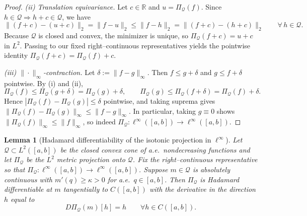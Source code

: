 \documentclass[12pt]{article}
\newtheorem{lemma}{Lemma}
\begin{document}
\begin{proof}
\smallskip
\noindent\emph{(ii) Translation equivariance.}
Let $c\in\mathbb R$ and $u=\Pi_{\mathcal Q}(f)$.
Since $h\in\mathcal Q\Rightarrow h+c\in\mathcal Q$, we have
\[
\|(f+c)-(u+c)\|_2=\|f-u\|_2\le \|f-h\|_2=\|(f+c)-(h+c)\|_2\qquad\forall\,h\in\mathcal Q.
\]
Because $\mathcal Q$ is closed and convex, the minimizer is unique, so $\Pi_{\mathcal Q}(f+c)=u+c$ in $L^2$.
Passing to our fixed right–continuous representatives yields the pointwise identity $\Pi_{\mathcal Q}(f+c)=\Pi_{\mathcal Q}(f)+c$.

\smallskip
\noindent\emph{(iii) $\|\cdot\|_\infty$-contraction.}
Let $\delta:=\|f-g\|_\infty$.
Then $f\le g+\delta$ and $g\le f+\delta$ pointwise.
By (i) and (ii),
\[
\Pi_{\mathcal Q}(f)\le \Pi_{\mathcal Q}(g+\delta)=\Pi_{\mathcal Q}(g)+\delta,
\qquad
\Pi_{\mathcal Q}(g)\le \Pi_{\mathcal Q}(f+\delta)=\Pi_{\mathcal Q}(f)+\delta.
\]
Hence $|\Pi_{\mathcal Q}(f)-\Pi_{\mathcal Q}(g)|\le \delta$ pointwise, and taking suprema gives
$\|\Pi_{\mathcal Q}(f)-\Pi_{\mathcal Q}(g)\|_\infty\le \|f-g\|_\infty$.
In particular, taking $g\equiv 0$ shows $\|\Pi_{\mathcal Q}(f)\|_\infty\le \|f\|_\infty$, so indeed
$\Pi_{\mathcal Q}:\ell^\infty([a,b])\to\ell^\infty([a,b])$.
\end{proof}
\begin{lemma}[Hadamard differentiability of the isotonic projection in $\ell^\infty$]\label{lem:iso-hadamard}
Let $\mathcal Q\subset L^2([a,b])$ be the closed convex cone of a.e.\ nondecreasing functions and let $\Pi_{\mathcal Q}$ be the $L^2$ metric projection onto $\mathcal Q$. Fix the right–continuous representative so that $\Pi_{\mathcal Q}:\ell^\infty([a,b])\to\ell^\infty([a,b])$.
Suppose $m\in\mathcal Q$ is absolutely continuous with $m'(q)\ge\kappa>0$ for a.e.\ $q\in[a,b]$. Then $\Pi_{\mathcal Q}$ is Hadamard differentiable at $m$ tangentially to $C([a,b])$ with the derivative in the direction $h$ equal to
\[
D \Pi_{\mathcal Q}(m)[h]=h\qquad\forall h\in C([a,b]).
\]
\end{lemma}
\end{document}
